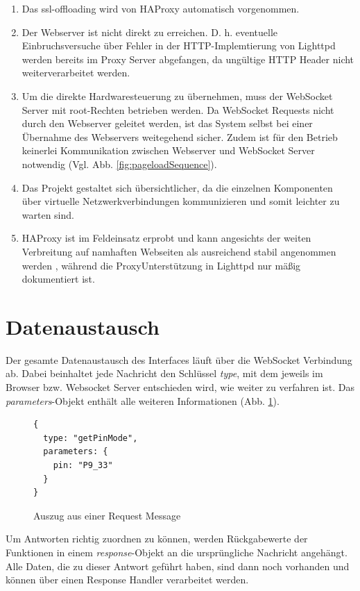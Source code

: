 \documentclass[thesis.tex]{subfiles}
\begin{document}
\begin{enumerate}
\item Das \gls{ssl-offloading} wird von HAProxy automatisch vorgenommen.
\item Der Webserver ist nicht direkt zu erreichen. D. h. eventuelle Einbruchsversuche über Fehler in der HTTP-Implemtierung von Lighttpd werden bereits im Proxy Server abgefangen, da ungültige HTTP Header nicht weiterverarbeitet werden.
\item Um die direkte Hardwaresteuerung zu übernehmen, muss der WebSocket Server mit root-Rechten betrieben werden. Da WebSocket Requests nicht durch den Webserver geleitet werden, ist das System selbst bei einer Übernahme des Webservers weitegehend sicher. Zudem ist für den Betrieb keinerlei Kommunikation zwischen Webserver und WebSocket Server notwendig (Vgl. Abb. \ref{fig:pageloadSequence}).
\item Das Projekt gestaltet sich übersichtlicher, da die einzelnen Komponenten über virtuelle Netzwerkverbindungen kommunizieren und somit leichter zu warten sind.   
\item HAProxy ist im Feldeinsatz erprobt und kann angesichts der weiten Verbreitung auf namhaften Webseiten als ausreichend stabil angenommen werden \cite{kuehnast2014}, während die ProxyUnterstützung in Lighttpd nur mäßig dokumentiert ist.
\end{enumerate}


\section{Datenaustausch}
Der gesamte Datenaustausch des Interfaces läuft über die WebSocket Verbindung ab. Dabei beinhaltet jede Nachricht den Schlüssel \textit{type}, mit dem jeweils im Browser bzw. Websocket Server entschieden wird, wie weiter zu verfahren ist. Das \textit{parameters}-Objekt enthält alle weiteren Informationen (Abb. \ref{lst:requestMessage}).\\

\begin{figure}[ht]
\begin{lstlisting}
{
  type: "getPinMode",
  parameters: {
    pin: "P9_33"
  }
}
\end{lstlisting}
\caption{Auszug aus einer Request Message}
\label{lst:requestMessage}
\end{figure}

Um Antworten richtig zuordnen zu können, werden Rückgabewerte der Funktionen in einem \textit{response}-Objekt an die ursprüngliche Nachricht angehängt. Alle Daten, die zu dieser Antwort geführt haben, sind dann noch vorhanden und können über einen Response Handler verarbeitet werden.\\
\end{document}
